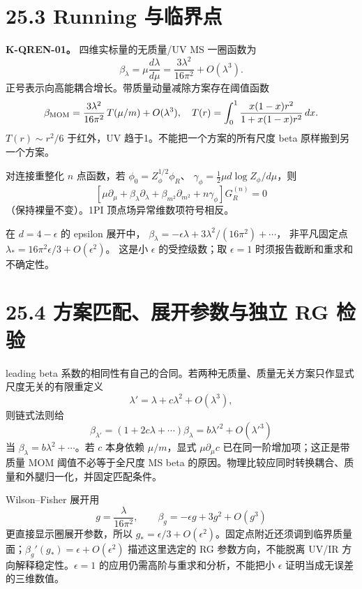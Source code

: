 \documentclass[
  11pt,
  oneside]{book}
\begin{document}
\hypertarget{running-ux4e0eux4e34ux754cux70b9}{%
\section{25.3 Running 与临界点}\label{running-ux4e0eux4e34ux754cux70b9}}

\textbf{K-QREN-01。} 四维实标量的无质量/UV MS 一圈函数为 \[
\beta_\lambda=\mu\frac{d\lambda}{d\mu}
=\frac{3\lambda^2}{16\pi^2}+O(\lambda^3).
\] 正号表示向高能耦合增长。带质量动量减除方案存在阈值函数 \[
\beta_{\rm MOM}=\frac{3\lambda^2}{16\pi^2}\,
T(\mu/m)+O(\lambda^3),\quad
T(r)=\int_0^1\frac{x(1-x)r^2}{1+x(1-x)r^2}\,dx.
\] \(T(r)\sim r^2/6\) 于红外，UV 趋于1。不能把一个方案的所有尺度 beta
原样搬到另一个方案。

对连接重整化 \(n\) 点函数，若 \(\phi_0=Z_\phi^{1/2}\phi_R\)、
\(\gamma_\phi=\tfrac12\mu d\log Z_\phi/d\mu\)，则 \[
[\mu\partial_\mu+\beta_\lambda\partial_\lambda+
\beta_{m^2}\partial_{m^2}+n\gamma_\phi]G_R^{(n)}=0
\] （保持裸量不变）。1PI 顶点场异常维数项符号相反。

在 \(d=4-\epsilon\) 的 epsilon 展开中，
\(\beta_\lambda=-\epsilon\lambda+3\lambda^2/(16\pi^2)+\cdots\)，
非平凡固定点 \(\lambda_*=16\pi^2\epsilon/3+O(\epsilon^2)\)。 这是小
\(\epsilon\) 的受控级数；取 \(\epsilon=1\)
时须报告截断和重求和不确定性。

\hypertarget{ux65b9ux6848ux5339ux914dux5c55ux5f00ux53c2ux6570ux4e0eux72ecux7acb-rg-ux68c0ux9a8c}{%
\section{25.4 方案匹配、展开参数与独立 RG
检验}\label{ux65b9ux6848ux5339ux914dux5c55ux5f00ux53c2ux6570ux4e0eux72ecux7acb-rg-ux68c0ux9a8c}}

leading beta
系数的相同性有自己的合同。若两种无质量、质量无关方案只作显式尺度无关的有限重定义
\[
\lambda'=\lambda+c\lambda^2+O(\lambda^3),
\] 则链式法则给 \[
\beta_{\lambda'}=(1+2c\lambda+\cdots)\beta_\lambda
=b\lambda'^2+O(\lambda'^3)
\] 当 \(\beta_\lambda=b\lambda^2+\cdots\)。若 \(c\) 本身依赖
\(\mu/m\)，显式 \(\mu\partial_\mu c\) 已在同一阶增加项；这正是带质量 MOM
阈值不必等于全尺度 MS beta
的原因。物理比较应同时转换耦合、质量和外腿归一化，并固定匹配条件。

Wilson--Fisher 展开用 \[
g=\frac{\lambda}{16\pi^2},\qquad
\beta_g=-\epsilon g+3g^2+O(g^3)
\] 更直接显示圈展开参数，所以
\(g_*=\epsilon/3+O(\epsilon^2)\)。固定点附近还须调到临界质量面；\(\beta_g'(g_*)=\epsilon+O(\epsilon^2)\)
描述这里选定的 RG 参数方向，不能脱离 UV/IR
方向解释稳定性。\(\epsilon=1\) 的应用仍需高阶与重求和分析，不能把小
\(\epsilon\) 证明当成无误差的三维数值。
\end{document}
